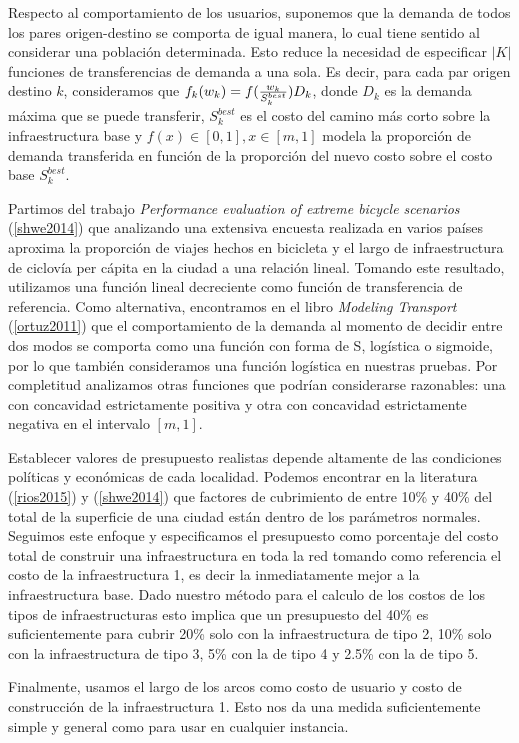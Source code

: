 \documentclass{article}
\begin{document}
  Respecto al comportamiento de los usuarios, suponemos que la demanda de todos los pares origen-destino se comporta de igual manera, lo cual tiene sentido al considerar una población determinada. Esto reduce la necesidad de especificar $|K|$ funciones de transferencias de demanda a una sola. Es decir, para cada par origen destino $k$, consideramos que $f_k(w_k) = f({w_k \over S^{best}_k})D_k$, donde $D_k$ es la demanda máxima que se puede transferir, $S^{best}_k$ es el costo del camino más corto sobre la infraestructura base y $f(x) \in [0, 1], x \in [m, 1]$ modela la proporción de demanda transferida en función de la proporción del nuevo costo sobre el costo base $S^{best}_k$.

  Partimos del trabajo {\it Performance evaluation of extreme bicycle scenarios} (\ref{shwe2014}) que analizando una extensiva encuesta realizada en varios países aproxima la proporción de viajes hechos en bicicleta y el largo de infraestructura de ciclovía per cápita en la ciudad a una relación lineal. Tomando este resultado, utilizamos una función lineal decreciente como función de transferencia de referencia. Como alternativa, encontramos en el libro {\it Modeling Transport} (\ref{ortuz2011}) que el comportamiento de la demanda al momento de decidir entre dos modos se comporta como una función con forma de S, logística o sigmoide, por lo que también consideramos una función logística en nuestras pruebas. Por completitud analizamos otras funciones que podrían considerarse razonables: una con concavidad estrictamente positiva y otra con concavidad estrictamente negativa en el intervalo $[m, 1]$.

  Establecer valores de presupuesto realistas depende altamente de las condiciones políticas y económicas de cada localidad. Podemos encontrar en la literatura (\ref{rios2015}) y (\ref{shwe2014}) que factores de cubrimiento de entre 10\% y 40\% del total de la superficie de una ciudad están dentro de los parámetros normales. Seguimos este enfoque y especificamos el presupuesto como porcentaje del costo total de construir una infraestructura en toda la red tomando como referencia el costo de la infraestructura 1, es decir la inmediatamente mejor a la infraestructura base. Dado nuestro método para el calculo de los costos de los tipos de infraestructuras esto implica que un presupuesto del 40\% es suficientemente para cubrir 20\% solo con la infraestructura de tipo 2, 10\% solo con la infraestructura de tipo 3, 5\% con la de tipo 4 y 2.5\% con la de tipo 5.

  Finalmente, usamos el largo de los arcos como costo de usuario y costo de construcción de la infraestructura 1. Esto nos da una medida suficientemente simple y general como para usar en cualquier instancia.
\end{document}
